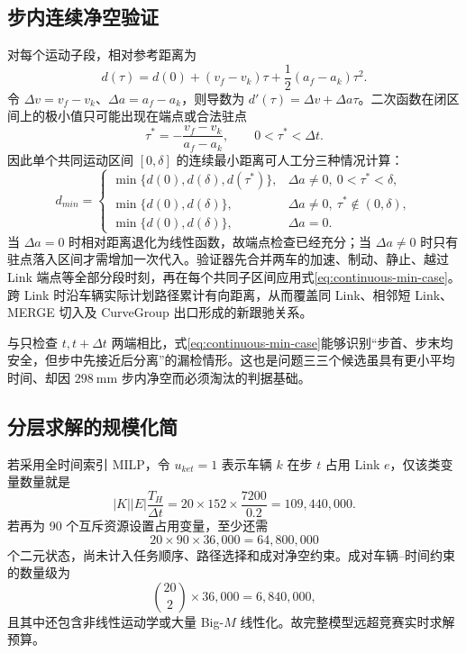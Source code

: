 \documentclass[UTF8]{ctexart}
\begin{document}
\subsection{步内连续净空验证}

对每个运动子段，相对参考距离为
\begin{equation}
d(\tau)=d(0)+(v_f-v_k)\tau+\frac12(a_f-a_k)\tau^2.
\end{equation}
令 $\Delta v=v_f-v_k$、$\Delta a=a_f-a_k$，则导数为 $d'(\tau)=\Delta v+\Delta a\tau$。二次函数在闭区间上的极小值只可能出现在端点或合法驻点
\begin{equation}
\tau^*=-\frac{v_f-v_k}{a_f-a_k},\qquad 0<\tau^*<\Delta t.
\end{equation}
因此单个共同运动区间 $[0,\delta]$ 的连续最小距离可人工分三种情况计算：
\begin{equation}\label{eq:continuous-min-case}
d_{min}=
\begin{cases}
\min\{d(0),d(\delta),d(\tau^*)\},&\Delta a\ne0,\ 0<\tau^*<\delta,\\
\min\{d(0),d(\delta)\},&\Delta a\ne0,\ \tau^*\notin(0,\delta),\\
\min\{d(0),d(\delta)\},&\Delta a=0.
\end{cases}
\end{equation}
当 $\Delta a=0$ 时相对距离退化为线性函数，故端点检查已经充分；当 $\Delta a\ne0$ 时只有驻点落入区间才需增加一次代入。验证器先合并两车的加速、制动、静止、越过 Link 端点等全部分段时刻，再在每个共同子区间应用式\eqref{eq:continuous-min-case}。跨 Link 时沿车辆实际计划路径累计有向距离，从而覆盖同 Link、相邻短 Link、MERGE 切入及 CurveGroup 出口形成的新跟驰关系。

与只检查 $t,t+\Delta t$ 两端相比，式\eqref{eq:continuous-min-case}能够识别“步首、步末均安全，但步中先接近后分离”的漏检情形。这也是问题三三个候选虽具有更小平均时间、却因 $298\ \mathrm{mm}$ 步内净空而必须淘汰的判据基础。

\subsection{分层求解的规模化简}

若采用全时间索引 MILP，令 $u_{ket}=1$ 表示车辆 $k$ 在步 $t$ 占用 Link $e$，仅该类变量数量就是
\begin{equation}
|K||E|\frac{T_H}{\Delta t}=20\times152\times\frac{7200}{0.2}
=109{,}440{,}000.
\end{equation}
若再为 90 个互斥资源设置占用变量，至少还需
\begin{equation}
20\times90\times36{,}000=64{,}800{,}000
\end{equation}
个二元状态，尚未计入任务顺序、路径选择和成对净空约束。成对车辆--时间约束的数量级为
\begin{equation}
\binom{20}{2}\times36{,}000=6{,}840{,}000,
\end{equation}
且其中还包含非线性运动学或大量 Big-$M$ 线性化。故完整模型远超竞赛实时求解预算。
\end{document}
